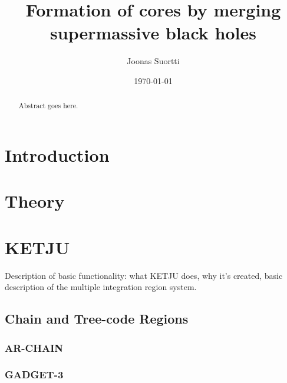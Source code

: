 \documentclass[english, oneside]{HYgradu}
\title{Formation of cores by merging supermassive black holes}
\author{Joonas Suortti}
\date{\today}
\begin{document}
\maketitle

\begin{abstract}
Abstract goes here.
\end{abstract}

\mytableofcontents



\chapter{Introduction}

\chapter{Theory}



\chapter{KETJU}

Description of basic functionality: what KETJU does, why it's created, basic description of the multiple integration region system. 

\section{Chain and Tree-code Regions}

\subsection{AR-CHAIN}

\subsection{GADGET-3}
\end{document}

